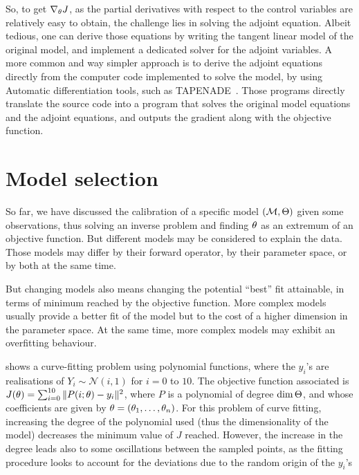 \documentclass[../../Main_ManuscritThese.tex]{subfiles}
\begin{document}
So, to get $\nabla_\theta J$, as the partial derivatives with respect
to the control variables are relatively easy to obtain, the challenge
lies in solving the adjoint equation. Albeit tedious, one can derive
those equations by writing the tangent linear model of the original
model, and implement a dedicated solver for the adjoint variables. A
more common and way simpler approach is to derive the adjoint
equations directly from the computer code implemented to solve the
model, by using Automatic differentiation tools, such as
\textsc{TAPENADE}~\citep{hascoet_tapenade_2013}. Those programs
directly translate the source code into a program that solves the
original model equations and the adjoint equations, and outputs the
gradient along with the objective function.


\section{Model selection}
\label{sec:model_selection}
So far, we have discussed the calibration of a specific model
$(\mathcal{M}, \Theta)$ given some observations, thus solving an
inverse problem and finding ${\theta}_{\mathrm{}}$ as an extremum of an
objective function. But different models may be considered to explain
the data. Those models may differ by their forward operator, by their
parameter space, or by both at the same time.

But changing models also means changing the potential ``best'' fit attainable, in terms of minimum reached by the objective function.
More complex models usually provide a better fit of the model but to the cost of a higher dimension in the parameter space. At the same time, more complex models may exhibit an overfitting behaviour.

\begin{example}
   shows a curve-fitting problem using
  polynomial functions, where the $y_i$'s are realisations of
  $Y_i \sim \mathcal{N}(i, 1)$ for $i=0$ to $10$. The objective
  function associated is
  $J(\theta) = \sum_{i=0}^{10}\|P(i;\theta) - y_i\|^2$, where $P$ is a
  polynomial of degree $\dim \Theta$, and whose coefficients are
  given by $\theta = (\theta_1,\dots,\theta_n)$.  For this problem of curve
  fitting, increasing the degree of the polynomial used (thus the
  dimensionality of the model) decreases the minimum value of $J$
  reached. However, the increase in the degree leads also to some
  oscillations between the sampled points, as the fitting procedure
  looks to account for the deviations due to the random origin of the
  $y_i$'s
\end{example}
\end{document}
